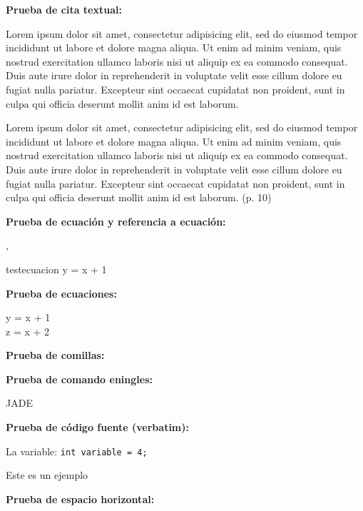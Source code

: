 \documentclass{uclamsc}
\begin{document}
\begin{contenido}
\cite{causa2007computacion}

\break

\espaciodoble\textbf{Prueba de cita textual:}

Lorem ipsum dolor sit amet, consectetur adipisicing elit, sed do eiusmod tempor incididunt ut labore et dolore magna aliqua. Ut enim ad minim veniam, quis nostrud exercitation ullamco laboris nisi ut aliquip ex ea commodo consequat. Duis aute irure dolor in reprehenderit in voluptate velit esse cillum dolore eu fugiat nulla pariatur. Excepteur sint occaecat cupidatat non proident, sunt in culpa qui officia deserunt mollit anim id est laborum.

\begin{citatextual}
Lorem ipsum dolor sit amet, consectetur adipisicing elit, sed do eiusmod tempor incididunt ut labore et dolore magna aliqua. Ut enim ad minim veniam, quis nostrud exercitation ullamco laboris nisi ut aliquip ex ea commodo consequat. Duis aute irure dolor in reprehenderit in voluptate velit esse cillum dolore eu fugiat nulla pariatur. Excepteur sint occaecat cupidatat non proident, sunt in culpa qui officia deserunt mollit anim id est laborum.
(p. 10)
\end{citatextual}

\espaciodoble\textbf{Prueba de ecuación y referencia a ecuación:}

, 

\begin{ecuacion}{testecuacion}
	y = x + 1
\end{ecuacion}

\espaciodoble\textbf{Prueba de ecuaciones:}

\begin{ecuaciones}
	y = x + 1 \\
	z = x + 2
\end{ecuaciones}

\espaciodoble\textbf{Prueba de comillas:}


\espaciodoble\textbf{Prueba de comando eningles:}

JADE 

\espaciodoble\textbf{Prueba de código fuente (verbatim):}

La variable: \verb|int variable = 4;|

Este es un ejemplo

\espaciodoble\textbf{Prueba de espacio horizontal:}


\end{contenido}
\end{document}
